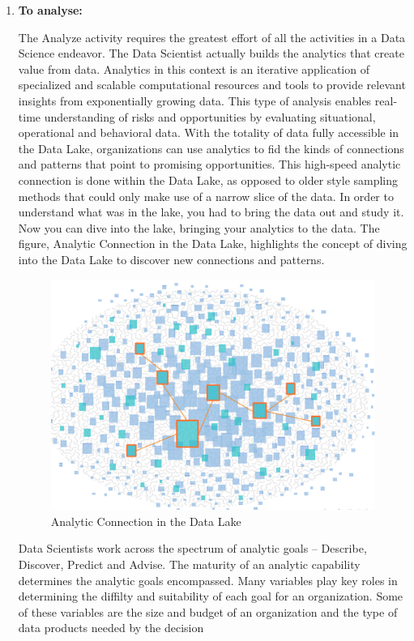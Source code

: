 \documentclass[a4paper,12pt,oneside]{report}
\begin{document}
{\begin{enumerate}
\item \textbf {To analyse: }{The Analyze activity requires the greatest effort of all the activities in a Data Science endeavor. The Data Scientist actually builds the analytics that create value from data. Analytics in this context is
an iterative application of specialized and scalable computational resources and tools to provide relevant insights from exponentially growing data. This type of analysis enables real-time understanding of risks and opportunities by evaluating situational, operational and behavioral data. With the totality of data fully accessible in the Data Lake, organizations can use analytics to fid the kinds of connections and patterns that point to promising opportunities. This high-speed analytic connection is done within the Data Lake, as opposed to older style sampling methods that could only make use of a narrow slice of the data. In order to understand what was in the lake, you had to bring the data out and study it. Now you can dive into the lake,
bringing your analytics to the data. The figure, Analytic Connection in the Data Lake, highlights the concept of diving into the Data Lake to discover new connections and patterns.\\
\begin{figure}[ht]
\centering
\includegraphics[width=1\textwidth]{"Capture7"}
\caption{Analytic Connection in the Data Lake}
\end{figure}
Data Scientists work across the spectrum of analytic goals – Describe, Discover, Predict and Advise. The maturity of an analytic capability determines the analytic goals encompassed. Many variables play key
roles in determining the diffilty and suitability of each goal for an organization. Some of these variables are the size and budget of an organization and the type of data products needed by the decision
}
\end{enumerate}}
\end{document}
